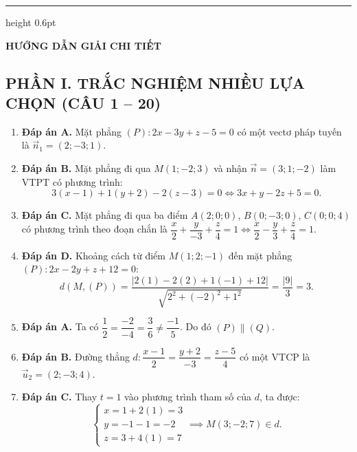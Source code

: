 \documentclass[12pt,a4paper]{article}
\begin{document}
\vspace{8pt}
\hrule height 0.6pt
\vspace{8pt}

\begin{center}
    {\fontsize{13}{15}\selectfont\textbf{HƯỚNG DẪN GIẢI CHI TIẾT}}
\end{center}

\subsection*{PHẦN I. TRẮC NGHIỆM NHIỀU LỰA CHỌN (CÂU 1 -- 20)}

\begin{enumerate}
\item \textbf{Đáp án A.}  
Mặt phẳng $(P): 2x - 3y + z - 5 = 0$ có một vectơ pháp tuyến là $\vec{n}_1 = (2; -3; 1)$.

\item \textbf{Đáp án B.}  
Mặt phẳng đi qua $M(1; -2; 3)$ và nhận $\vec{n} = (3; 1; -2)$ làm VTPT có phương trình:
\[
3(x - 1) + 1(y + 2) - 2(z - 3) = 0 \iff 3x + y - 2z + 5 = 0.
\]

\item \textbf{Đáp án C.}  
Mặt phẳng đi qua ba điểm $A(2; 0; 0)$, $B(0; -3; 0)$, $C(0; 0; 4)$ có phương trình theo đoạn chắn là $\dfrac{x}{2} + \dfrac{y}{-3} + \dfrac{z}{4} = 1 \iff \dfrac{x}{2} - \dfrac{y}{3} + \dfrac{z}{4} = 1$.

\item \textbf{Đáp án D.}  
Khoảng cách từ điểm $M(1; 2; -1)$ đến mặt phẳng $(P): 2x - 2y + z + 12 = 0$:
\[
d(M, (P)) = \dfrac{|2(1) - 2(2) + 1(-1) + 12|}{\sqrt{2^2 + (-2)^2 + 1^2}} = \dfrac{|9|}{3} = 3.
\]

\item \textbf{Đáp án A.}  
Ta có $\dfrac{1}{2} = \dfrac{-2}{-4} = \dfrac{3}{6} \ne \dfrac{-1}{5}$. Do đó $(P) \parallel (Q)$.

\item \textbf{Đáp án B.}  
Đường thẳng $d: \dfrac{x-1}{2} = \dfrac{y+2}{-3} = \dfrac{z-5}{4}$ có một VTCP là $\vec{u}_2 = (2; -3; 4)$.

\item \textbf{Đáp án C.}  
Thay $t = 1$ vào phương trình tham số của $d$, ta được:
\[
\begin{cases} x = 1 + 2(1) = 3 \\ y = -1 - 1 = -2 \\ z = 3 + 4(1) = 7 \end{cases} \implies M(3; -2; 7) \in d.
\]


\end{enumerate}
\end{document}
